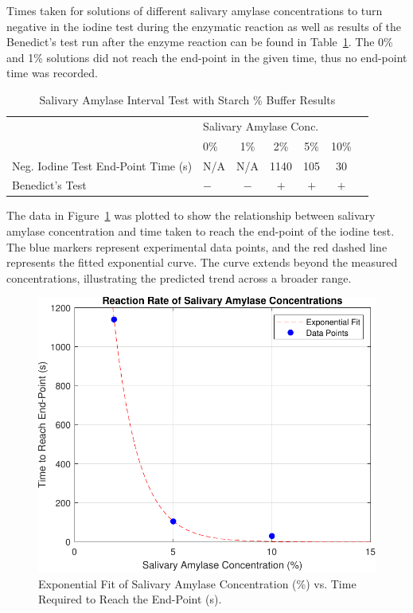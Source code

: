 \documentclass[12pt]{article}
\begin{document}
        Times taken for solutions of different salivary amylase concentrations to turn negative in the iodine test during the enzymatic reaction as well as results of the Benedict's test run after the enzyme reaction can be found in Table~\ref{sa_interval}. The 0\% and 1\% solutions did not reach the end-point in the given time, thus no end-point time was recorded.  
        \begin{table}[H]
            \caption{Salivary Amylase Interval Test with Starch \% Buffer Results}
            \centering
            \begin{tabular}{@{}llccccc@{}}
                \toprule
                & \multicolumn{5}{l}{Salivary Amylase Conc.} \\ 
                \cmidrule(l){2-6} 
                & 0\% & 1\% & 2\% & 5\% & 10\% \\ 
                \midrule
                Neg. Iodine Test End-Point Time (s) & N/A & N/A & 1140 & 105 & 30 \\
                Benedict's Test & \(-\) & \(-\) & \(+\) & \(+\)  & \(+\) \\
                \bottomrule
            \end{tabular}\label{sa_interval}
        \end{table}

        The data in Figure~\ref{sa_curve} was plotted to show the relationship between salivary amylase concentration and time taken to reach the end-point of the iodine test. 
        The blue markers represent experimental data points, and the red dashed line represents the fitted exponential curve. 
        The curve extends beyond the measured concentrations, illustrating the predicted trend across a broader range.
        \begin{figure}[H]
            \centerline{\includegraphics[width = 0.75\linewidth]{sa_curve.pdf}}
            \caption{Exponential Fit of Salivary Amylase Concentration (\%) vs. Time Required to Reach the End-Point (s).}\label{sa_curve}
        \end{figure}
\end{document}
